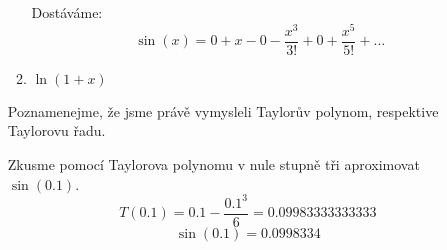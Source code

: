 \begin{enumerate}
\begin{enumerate}
{					Dostáváme:
					$$\sin(x) = 0 + x - 0 - \frac{x^3}{3!} + 0 + \frac{x^5}{5!} + \ldots$$
				}

			\item  $\ln(1+x)$

		\end{enumerate}

		Poznamenejme, že jsme právě vymysleli Taylorův polynom, respektive Taylorovu řadu.

		Zkusme pomocí Taylorova polynomu v nule stupně tři aproximovat $\sin(0.1)$.
		$$T(0.1) = 0.1 - \frac{0.1^3}{6} = 0.09983333333333$$
		$$\sin(0.1) = 0.0998334$$

\end{enumerate}

